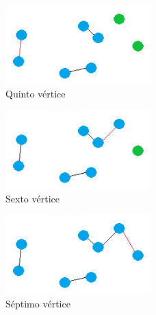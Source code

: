 \begin{frame}
	\begin{exampleblock}{ }
	\begin{figure}[htbH] 
		\centering
		\includegraphics[width=0.5\textwidth]{./Imagenes/arista4.png}
		\caption{Quinto vértice} 
	\end{figure}
	\end{exampleblock}
\end{frame}

\begin{frame}
	\begin{exampleblock}{ }
	\begin{figure}[htbH] 
		\centering
		\includegraphics[width=0.5\textwidth]{./Imagenes/arista5.png}
		\caption{Sexto vértice} 
	\end{figure}
	\end{exampleblock}
\end{frame}

\begin{frame}
	\begin{exampleblock}{ }
	\begin{figure}[htbH] 
		\centering
		\includegraphics[width=0.5\textwidth]{./Imagenes/arista6.png}
		\caption{Séptimo vértice} 
	\end{figure}
	\end{exampleblock}
\end{frame}

